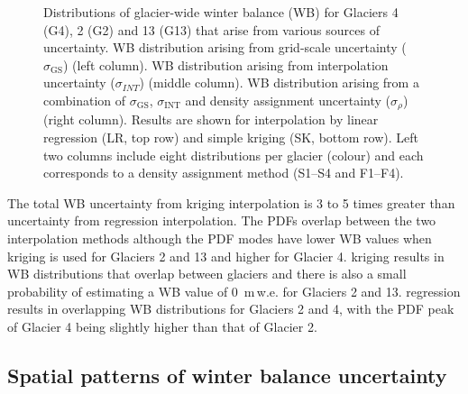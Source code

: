 \documentclass{sfuthesis}
\begin{document}
\begin{figure}
	\centering
	\caption{Distributions of glacier-wide winter balance (WB) for Glaciers 4 (G4), 2 (G2) and 13 (G13) that arise from various sources of uncertainty. WB distribution arising from grid-scale uncertainty ($\sigma_{\mathrm{GS}}$) (left column). WB distribution arising from interpolation uncertainty ($\sigma_{INT}$) (middle column). WB distribution arising from a combination of $\sigma_{\mathrm{GS}}$, $\sigma_{\mathrm{INT}}$ and density assignment uncertainty ($\sigma_{\rho}$) (right column). Results are shown for interpolation by linear regression (LR, top row) and simple kriging (SK, bottom row). Left two columns include eight distributions per glacier (colour) and each corresponds to a density assignment method (S1--S4 and F1--F4).}
	\label{fig:WSMBDist_LR}
\end{figure}

The total WB uncertainty from kriging interpolation is 3 to 5 times greater than uncertainty from regression interpolation. The PDFs overlap between the two interpolation methods although the PDF modes have lower WB values when kriging is used for Glaciers 2 and 13 and higher for Glacier 4. kriging results in WB distributions that overlap between glaciers and there is also a small probability of estimating a WB value of 0 \,m\,w.e. for Glaciers 2 and 13. regression results in overlapping WB distributions for Glaciers 2 and 4, with the PDF peak of Glacier 4 being slightly higher than that of Glacier 2. 

\subsection{Spatial patterns of winter balance uncertainty}
\end{document}

